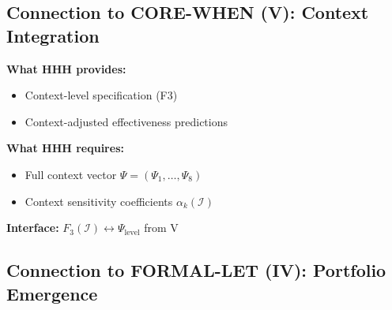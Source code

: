 \subsection{Connection to CORE-WHEN (V): Context Integration}

\begin{tcolorbox}[colback=yellow!5!white, colframe=yellow!75!black,
    title=Integration: HHH $\leftrightarrow$ CORE-WHEN (V)]
\textbf{What HHH provides:}
\begin{itemize}[nosep]
\item Context-level specification (F3)
\item Context-adjusted effectiveness predictions
\end{itemize}

\textbf{What HHH requires:}
\begin{itemize}[nosep]
\item Full context vector $\Psi = (\Psi_1, \ldots, \Psi_8)$
\item Context sensitivity coefficients $\alpha_k(\mathcal{I})$
\end{itemize}

\textbf{Interface:} $F_3(\mathcal{I}) \leftrightarrow \Psi_{\text{level}}$ from V
\end{tcolorbox}

\subsection{Connection to FORMAL-LET (IV): Portfolio Emergence}

